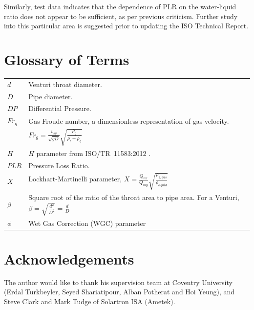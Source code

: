 \documentclass[journal]{IEEEtran}
\begin{document}
Similarly, test data indicates that the dependence of \acrshort{PLR} on the water-liquid ratio does not appear to be sufficient, as per previous criticism.  Further study into this particular area is suggested prior to updating the ISO Technical Report.


\section*{Glossary of Terms}

\begin{tabular}{p{0.6cm} p{7.3cm}}
\\
$d$ & Venturi throat diameter. \\
$D$ & Pipe diameter. \\
$DP$ & Differential Pressure. \\
$Fr_{g}$ &  Gas Froude number, a dimensionless representation of gas velocity. \\
& $Fr_{g} = \frac{v_{sg}}{\sqrt{gD}}\sqrt{\frac{\rho_{g}}{\rho_{l}-\rho_{g}}}$ \\
$H$ & $H$ parameter from ISO/TR~11583:2012 \cite{2012ISO/TRConduits}. \\
$PLR$ & Pressure Loss Ratio. \\
$X$ & Lockhart-Martinelli parameter, $X=\frac{Q_{ml}}{Q_{mg}}\sqrt{\frac{\rho_{1,gas}}{\rho_{liquid}}}$ \\
$\beta$ & Square root of the ratio of the throat area to pipe area.    For a Venturi, $\beta=\sqrt{\frac{d^{2}}{D^{2}}}=\frac{d}{D}$ \\
$\phi$ & Wet Gas Correction (WGC) parameter
\end{tabular}

\section*{Acknowledgements}
The author would like to thank his supervision team at Coventry University (Erdal Turkbeyler, Seyed Shariatipour, Alban Potherat and Hoi Yeung), and Steve Clark and Mark Tudge of Solartron ISA (Ametek).





%
%
%
\end{document}
